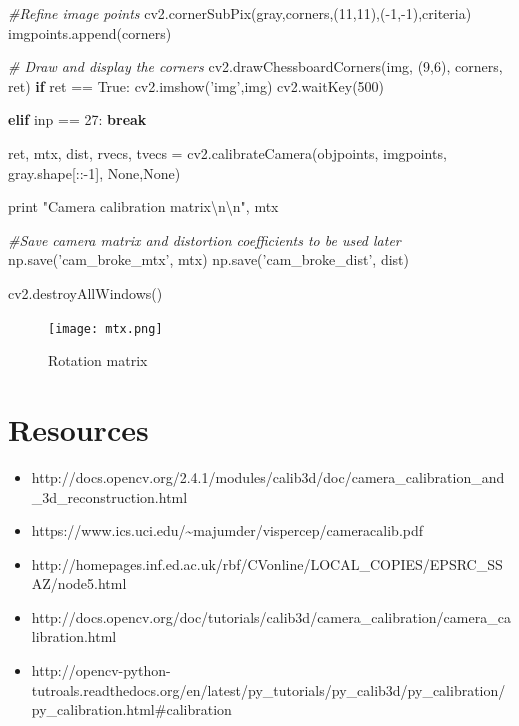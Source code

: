 \documentclass[]{article}
\newenvironment{Shaded}{}{}
\newcommand{\DecValTok}[1]{\textcolor[rgb]{0.25,0.63,0.44}{{#1}}}
\newcommand{\CharTok}[1]{\textcolor[rgb]{0.25,0.44,0.63}{{#1}}}
\newcommand{\StringTok}[1]{\textcolor[rgb]{0.25,0.44,0.63}{{#1}}}
\newcommand{\CommentTok}[1]{\textcolor[rgb]{0.38,0.63,0.69}{\textit{{#1}}}}
\newcommand{\VariableTok}[1]{\textcolor[rgb]{0.10,0.09,0.49}{{#1}}}
\newcommand{\ControlFlowTok}[1]{\textcolor[rgb]{0.00,0.44,0.13}{\textbf{{#1}}}}
\newcommand{\OperatorTok}[1]{\textcolor[rgb]{0.40,0.40,0.40}{{#1}}}
\newcommand{\BuiltInTok}[1]{{#1}}
\newcommand{\NormalTok}[1]{{#1}}
\providecommand{\tightlist}{%
  \setlength{\itemsep}{0pt}\setlength{\parskip}{0pt}}
\begin{document}
\begin{Shaded}
\begin{Highlighting}[]
            \CommentTok{#Refine image points}
            \NormalTok{cv2.cornerSubPix(gray,corners,(}\DecValTok{11}\NormalTok{,}\DecValTok{11}\NormalTok{),(}\OperatorTok{-}\DecValTok{1}\NormalTok{,}\OperatorTok{-}\DecValTok{1}\NormalTok{),criteria)}
            \NormalTok{imgpoints.append(corners)}

            \CommentTok{# Draw and display the corners}
            \NormalTok{cv2.drawChessboardCorners(img, (}\DecValTok{9}\NormalTok{,}\DecValTok{6}\NormalTok{), corners, ret)}
            \ControlFlowTok{if} \NormalTok{ret }\OperatorTok{==} \VariableTok{True}\NormalTok{:}
                \NormalTok{cv2.imshow(}\StringTok{'img'}\NormalTok{,img)}
                \NormalTok{cv2.waitKey(}\DecValTok{500}\NormalTok{)}

    \ControlFlowTok{elif} \NormalTok{inp }\OperatorTok{==} \DecValTok{27}\NormalTok{: }\ControlFlowTok{break}


\NormalTok{ret, mtx, dist, rvecs, tvecs }\OperatorTok{=} \NormalTok{cv2.calibrateCamera(objpoints,}
                                                   \NormalTok{imgpoints, gray.shape[::}\OperatorTok{-}\DecValTok{1}\NormalTok{],}
                                                   \VariableTok{None}\NormalTok{,}\VariableTok{None}\NormalTok{)}



\BuiltInTok{print} \StringTok{"Camera calibration matrix}\CharTok{\textbackslash{}n\textbackslash{}n}\StringTok{"}\NormalTok{, mtx}

\CommentTok{#Save camera matrix and distortion coefficients to be used later}
\NormalTok{np.save(}\StringTok{'cam_broke_mtx'}\NormalTok{, mtx)}
\NormalTok{np.save(}\StringTok{'cam_broke_dist'}\NormalTok{, dist)}

\NormalTok{cv2.destroyAllWindows()}
\end{Highlighting}
\end{Shaded}

\begin{figure}[htbp]
	\centering
	\texttt{[image: mtx.png]}
	\caption{Rotation matrix}
\end{figure}

\section{Resources}\label{resources}

\begin{itemize}
\tightlist
\item
  http://docs.opencv.org/2.4.1/modules/calib3d/doc/camera\_calibration\_and\_3d\_reconstruction.html
\item
  https://www.ics.uci.edu/\textasciitilde{}majumder/vispercep/cameracalib.pdf
\item
  http://homepages.inf.ed.ac.uk/rbf/CVonline/LOCAL\_COPIES/EPSRC\_SSAZ/node5.html
\item
  http://docs.opencv.org/doc/tutorials/calib3d/camera\_calibration/camera\_calibration.html
\item
  http://opencv-python-tutroals.readthedocs.org/en/latest/py\_tutorials/py\_calib3d/py\_calibration/py\_calibration.html\#calibration
\end{itemize}
\end{document}

